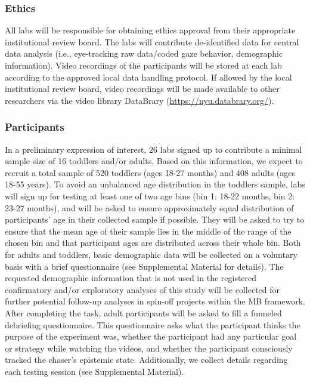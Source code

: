 \documentclass[
  man,floatsintext]{apa6}
\begin{document}
\subsubsection{Ethics}\label{ethics}

All labs will be responsible for obtaining ethics approval from their appropriate institutional review board. The labs will contribute de-identified data for central data analysis (i.e., eye-tracking raw data/coded gaze behavior, demographic information). Video recordings of the participants will be stored at each lab according to the approved local data handling protocol. If allowed by the local institutional review board, video recordings will be made available to other researchers via the video library DataBrary (\url{https://nyu.databrary.org/}).

\subsubsection{Participants}\label{participants}

In a preliminary expression of interest, 26 labs signed up to contribute a minimal sample size of 16 toddlers and/or adults. Based on this information, we expect to recruit a total sample of 520 toddlers (ages 18-27 months) and 408 adults (ages 18-55 years). To avoid an unbalanced age distribution in the toddlers sample, labs will sign up for testing at least one of two age bins (bin 1: 18-22 months, bin 2: 23-27 months), and will be asked to ensure approximately equal distribution of participants' age in their collected sample if possible. They will be asked to try to ensure that the mean age of their sample lies in the middle of the range of the chosen bin and that participant ages are distributed across their whole bin. Both for adults and toddlers, basic demographic data will be collected on a voluntary basis with a brief questionnaire (see Supplemental Material for details). The requested demographic information that is not used in the registered confirmatory and/or exploratory analyses of this study will be collected for further potential follow-up analyses in spin-off projects within the MB framework.
After completing the task, adult participants will be asked to fill a funneled debriefing questionnaire. This questionnaire asks what the participant thinks the purpose of the experiment was, whether the participant had any particular goal or strategy while watching the videos, and whether the participant consciously tracked the chaser's epistemic state. Additionally, we collect details regarding each testing session (see Supplemental Material).
\end{document}
